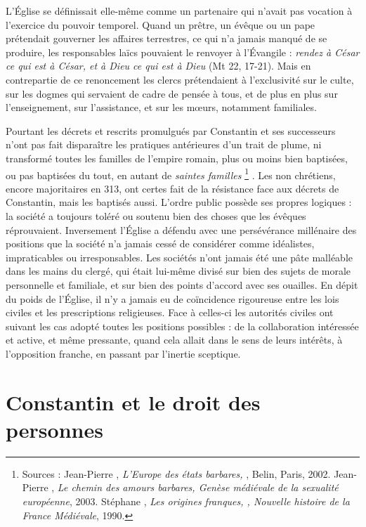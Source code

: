  L'Église se définissait elle-même comme un partenaire qui n'avait pas vocation à l'exercice du pouvoir temporel. Quand un prêtre, un évêque ou un pape prétendait gouverner les affaires terrestres, ce qui n'a jamais manqué de se produire, les responsables laïcs pouvaient le renvoyer à l'Évangile : \emph{rendez à César ce qui est à César, et à Dieu ce qui est à Dieu} (Mt 22, 17-21). Mais en contrepartie de ce renoncement les clercs prétendaient à l'exclusivité sur le culte, sur les dogmes qui servaient de cadre de pensée à tous, et de plus en plus sur l'enseignement, sur l'assistance, et sur les mœurs, notamment familiales. 

 Pourtant les décrets et rescrits promulgués par Constantin et ses successeurs n'ont pas fait disparaître les pratiques antérieures d'un trait de plume, ni transformé toutes les familles de l'empire romain, plus ou moins bien baptisées, ou pas baptisées du tout, en autant de \emph{saintes familles}%
\footnote{Sources : Jean-Pierre , \emph{L'Europe des états barbares, }, Belin, Paris, 2002. Jean-Pierre , \emph{Le chemin des amours barbares, Genèse médiévale de la sexualité européenne}, 2003. Stéphane , \emph{Les origines franques, , Nouvelle histoire de la France Médiévale}, 1990.}%
. Les non chrétiens, encore majoritaires en 313, ont certes fait de la résistance face aux décrets de Constantin, mais les baptisés aussi. L'ordre public possède ses propres logiques : la société a toujours toléré ou soutenu bien des choses que les évêques réprouvaient. Inversement l'Église a défendu avec une persévérance millénaire des positions que la société n'a jamais cessé de considérer comme idéalistes, impraticables ou irresponsables. Les sociétés n'ont jamais été une pâte malléable dans les mains du clergé, qui était lui-même divisé sur bien des sujets de morale personnelle et familiale, et sur bien des points d'accord avec ses ouailles. En dépit du poids de l'Église, il n'y a jamais eu de coïncidence rigoureuse entre les lois civiles et les prescriptions religieuses. Face à celles-ci les autorités civiles ont suivant les cas adopté toutes les positions possibles : de la collaboration intéressée et active, et même pressante, quand cela allait dans le sens de leurs intérêts, à l'opposition franche, en passant par l'inertie sceptique.



\section{Constantin et le droit des personnes}


